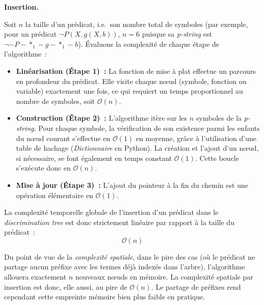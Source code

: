 \documentclass[11pt]{article}
\newenvironment{paraph}[1]{%
  \medskip
  \noindent\textbf{#1.}\quad

  \vspace{0.2cm}
}{%
  \medskip
}
\begin{document}
\begin{paraph}{Insertion}
\begin{algorithm}[H]
\begin{algorithmic}[1]
            \EndProcedure

        \end{algorithmic}
    \end{algorithm}

    \vspace{0.2cm}
    Soit $n$ la taille d'un prédicat, i.e.~son nombre total de symboles (par exemple, pour un 
    prédicat $\neg P(X, g(X, b))$, $n=6$ puisque sa \textit{p-string} est $\neg -P-*_1-g-*_1-b$). 
    Évaluons la complexité de chaque étape de l'algorithme~:

    \begin{itemize}
        \item \textbf{Linéarisation (Étape 1)~:} La fonction de mise à plat effectue un parcours 
        en profondeur du prédicat. Elle visite chaque nœud (symbole, fonction ou variable) exactement 
        une fois, ce qui requiert un temps proportionnel au nombre de symboles, soit $\mathcal{O}(n)$.
        
        \item \textbf{Construction (Étape 2)~:} L'algorithme itère sur les $n$ symboles de la 
        \textit{p-string}. Pour chaque symbole, la vérification de son existence parmi les enfants du 
        nœud courant s'effectue en $\mathcal{O}(1)$ en moyenne, grâce à l'utilisation d'une table 
        de hachage (\textit{Dictionnaire} en Python). La création et l'ajout d'un nœud, si nécessaire, 
        se font également en temps constant $\mathcal{O}(1)$. Cette boucle s'exécute donc en $\mathcal{O}(n)$.
        
        \item \textbf{Mise à jour (Étape 3)~:} L'ajout du pointeur à la fin du chemin est une opération 
        élémentaire en $\mathcal{O}(1)$.
    \end{itemize}

    \vspace{0.2cm}
    La complexité temporelle globale de l'insertion d'un prédicat dans le \textit{discrimination tree} 
    est donc strictement linéaire par rapport à la taille du prédicat~:
    \[
    \mathcal{O}(n)
    \]

    \vspace{0.2cm}
    \noindent Du point de vue de la \textit{complexité spatiale}, dans le pire des cas (où le 
    prédicat ne partage aucun préfixe avec les termes déjà indexés dans l'arbre), l'algorithme allouera 
    exactement $n$ nouveaux nœuds en mémoire. La complexité spatiale par insertion est donc, elle aussi, 
    au pire de $\mathcal{O}(n)$. Le partage de préfixes rend cependant cette empreinte mémoire bien plus 
    faible en pratique.
\end{paraph}
\end{document}
